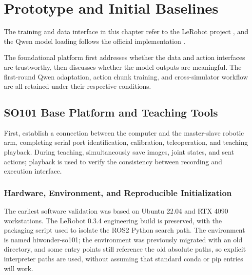 \chapter{Prototype and Initial Baselines}
The training and data interface in this chapter refer to the LeRobot project \cite{lerobot}, and the Qwen model loading follows the official implementation \cite{qwen}.


The foundational platform first addresses whether the data and action interfaces are trustworthy, then discusses whether the model outputs are meaningful. The first-round Qwen adaptation, action chunk training, and cross-simulator workflow are all retained under their respective conditions.

\section{SO101 Base Platform and Teaching Tools}

\label{stage:s01}

First, establish a connection between the computer and the master-slave robotic arm, completing serial port identification, calibration, teleoperation, and teaching playback. During teaching, simultaneously save images, joint states, and sent actions; playback is used to verify the consistency between recording and execution interface.

\subsection{Hardware, Environment, and Reproducible Initialization}\label{s01-detail-1}

The earliest software validation was based on Ubuntu 22.04 and RTX 4090 workstations. The LeRobot 0.3.4 engineering build is preserved, with the packaging script used to isolate the ROS2 Python search path. The environment is named hiwonder-so101; the environment was previously migrated with an old directory, and some entry points still reference the old absolute paths, so explicit interpreter paths are used, without assuming that standard conda or pip entries will work.

